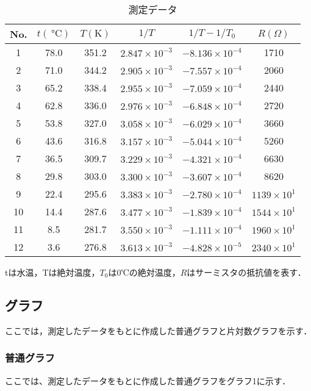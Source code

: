 \documentclass[a4paper,11pt,dvipdfmx]{jsarticle}
\begin{document}
\begin{table}[h]
\centering
\caption{測定データ}
\begin{tabular}{|c|c|c|c|c|c|}
\hline
No. & \( t(\SI{}{\celsius}) \) & \( T(\mathrm{K}) \) & \( 1/T \) & \( 1/T - 1/T_0 \) & \( R(\Omega) \) \\
\hline
1 & 78.0 & 351.2 & \( 2.847 \times 10^{-3} \) & \( -8.136 \times 10^{-4} \) & 1710 \\
2 & 71.0 & 344.2 & \( 2.905 \times 10^{-3} \) & \( -7.557 \times 10^{-4} \) & 2060 \\
3 & 65.2 & 338.4 & \( 2.955 \times 10^{-3} \) & \( -7.059 \times 10^{-4} \) & 2440 \\
4 & 62.8 & 336.0 & \( 2.976 \times 10^{-3} \) & \( -6.848 \times 10^{-4} \) & 2720 \\
5 & 53.8 & 327.0 & \( 3.058 \times 10^{-3} \) & \( -6.029 \times 10^{-4} \) & 3660 \\
6 & 43.6 & 316.8 & \( 3.157 \times 10^{-3} \) & \( -5.044 \times 10^{-4} \) & 5260 \\
7 & 36.5 & 309.7 & \( 3.229 \times 10^{-3} \) & \( -4.321 \times 10^{-4} \) & 6630 \\
8 & 29.8 & 303.0 & \( 3.300 \times 10^{-3} \) & \( -3.607 \times 10^{-4} \) & 8620 \\
9 & 22.4 & 295.6 & \( 3.383 \times 10^{-3} \) & \( -2.780 \times 10^{-4} \) & \( 1139 \times 10^1 \) \\
10 & 14.4 & 287.6 & \( 3.477 \times 10^{-3} \) & \( -1.839 \times 10^{-4} \) & \( 1544 \times 10^1 \) \\
11 & 8.5 & 281.7 & \( 3.550 \times 10^{-3} \) & \( -1.111 \times 10^{-4} \) & \( 1960 \times 10^1 \) \\
12 & 3.6 & 276.8 & \( 3.613 \times 10^{-3} \) & \( -4.828 \times 10^{-5} \) & \( 2340 \times 10^1 \) \\
\hline
\end{tabular}
\end{table}

tは水温，Tは絶対温度，\( T_0 \)は0℃の絶対温度，\( R \)はサーミスタの抵抗値を表す．

\subsection{グラフ}
ここでは，測定したデータをもとに作成した普通グラフと片対数グラフを示す．
\subsubsection{普通グラフ}
ここでは、測定したデータをもとに作成した普通グラフをグラフ1に示す．
\newpage
\end{document}
